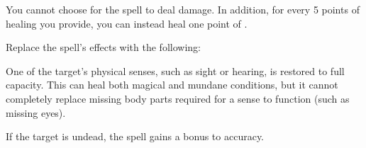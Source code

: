 You cannot choose for the spell to deal damage.
In addition, for every 5 points of healing you provide, you can instead heal one point of .









Replace the spell's effects with the following:
\begin{spellcontent}

\begin{augmenteffects}



\spelleffect
One of the target's physical senses, such as sight or hearing, is restored to full capacity.
This can heal both magical and mundane conditions, but it cannot completely replace missing body parts required for a sense to function (such as missing eyes).








\end{augmenteffects}

\end{spellcontent}






If the target is undead, the spell gains a  bonus to accuracy.









